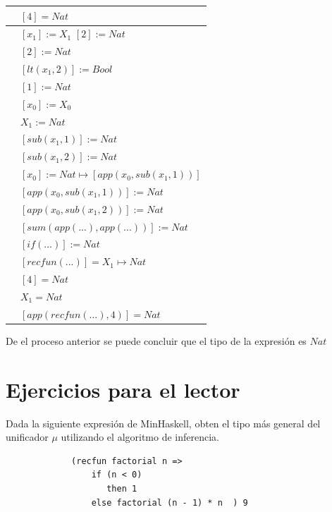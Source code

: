 \begin{exercise}
\begin{description}
\begin{center}
\begin{longtable}{ | l | l | }
                        & $[4] = Nat$ \\
                    \hline
                        & $[x_1] := X_1$ $[2] := Nat$ \\
                        & $[2] := Nat$ \\
                        & $[lt(x_1 , 2)] := Bool$ \\
                        & $[1] := Nat$ \\
                        & $[x_0] := X_0$ \\
                        & $X_1 := Nat$ \\
                        & $[sub(x_1,1)] := Nat$ \\
                        & $[sub(x_1,2)] := Nat$ \\
                        & $[x_0] := Nat \mapsto [app(x_0, sub(x_1,1))]$ \\
                        & $[app(x_0, sub(x_1,1))] := Nat$ \\
                        & $[app(x_0, sub(x_1,2))] := Nat$ \\
                        & $[sum(app(...), app(...))] := Nat$ \\
                        & $[if(...)] := Nat $ \\
                        & $[recfun(...)] = X_1 \mapsto Nat$  \\
                        & $[4] = Nat $ \\
                        & $X_1 = Nat $\\
                        & $[app(recfun(...), 4)] = Nat$ \\
                    \hline
                \end{longtable}
            \end{center}
        \end{description}
            De el proceso anterior se puede concluir que el tipo de la expresión es $Nat$
    \end{exercise}
    
    \section{Ejercicios para el lector}

     \begin{exercise} Dada la siguiente expresión de MinHaskell, obten el tipo más general del unificador $\mu$ utilizando el algoritmo de inferencia.
          \begin{lstlisting}
             (recfun factorial n => 
                 if (n < 0) 
                    then 1
                 else factorial (n - 1) * n  ) 9
           \end{lstlisting}
     \end{exercise}

